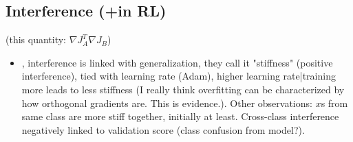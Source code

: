 \subsection{Interference (+in RL)}
(this quantity: $\nabla J_A^T\nabla J_B$)
\begin{itemize}
   \item \cite{fort2019stiffness}, interference is linked with generalization, they call it "stiffness" (positive interference), tied with learning rate (Adam), higher learning rate|training more leads to less stiffness (I really think overfitting can be characterized by how orthogonal gradients are. This is evidence.). Other observations: $x$s from same class are more stiff together, initially at least. Cross-class interference negatively linked to validation score (class confusion from model?).
   

\end{itemize}

